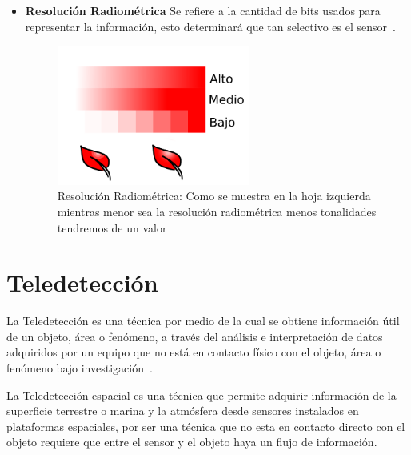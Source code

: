 \begin{itemize}
\item \textbf{Resolución Radiométrica}\newline
Se refiere a la cantidad de bits usados para representar la información, esto determinará que tan selectivo es el sensor~\cite{wulder2012remote}. 
\begin{figure}[H]
    \centering
    \includegraphics[width=0.6\textwidth]{images/02theory/resolucionRadiometrica.png}
    \caption[Resolución Radiométrica]{Resolución Radiométrica: Como se muestra en la hoja izquierda mientras menor sea la resolución radiométrica menos tonalidades tendremos de un valor}
    \label{fig:my_label}
\end{figure}
\end{itemize}

\section{Teledetección }
La Teledetección es una técnica por medio de la cual se obtiene información útil de un objeto, área o fenómeno, a través del análisis e interpretación de datos adquiridos por un equipo que no está en contacto físico con el objeto, área o fenómeno bajo investigación~\cite{jensen1987introductory}. 


La Teledetección espacial es una técnica que permite adquirir información de la superficie terrestre o marina y la atmósfera desde sensores instalados en plataformas espaciales, por ser una técnica que no esta en contacto directo con el objeto requiere que entre el sensor y el objeto haya un flujo de información.
